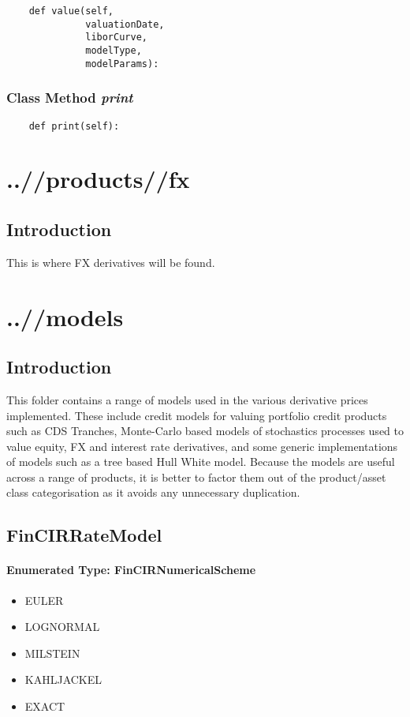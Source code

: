 \documentclass[twoside,11pt]{book}
\begin{document}
\begin{lstlisting}
    def value(self, 
              valuationDate,
              liborCurve, 
              modelType, 
              modelParams):
\end{lstlisting}

\subsection{Class Method {\it print}}


\begin{lstlisting}
    def print(self):
\end{lstlisting}


\chapter{..//products//fx}
\section{Introduction}
This is where FX derivatives will be found.

\chapter{..//models}
\section{Introduction}
This folder contains a range of models used in the various derivative prices implemented. These include credit models for valuing portfolio credit products such as CDS Tranches, Monte-Carlo based models of stochastics processes used to value equity, FX and interest rate derivatives, and some generic implementations of models such as a tree based Hull White model. Because the models are useful across a range of products, it is better to factor them out of the product/asset class categorisation as it avoids any unnecessary duplication.

\newpage
\section{FinCIRRateModel}

\subsubsection{Enumerated Type: FinCIRNumericalScheme}
\begin{itemize}
\item{EULER}
\item{LOGNORMAL}
\item{MILSTEIN}
\item{KAHLJACKEL}
\item{EXACT}
\end{itemize}
\end{document}
